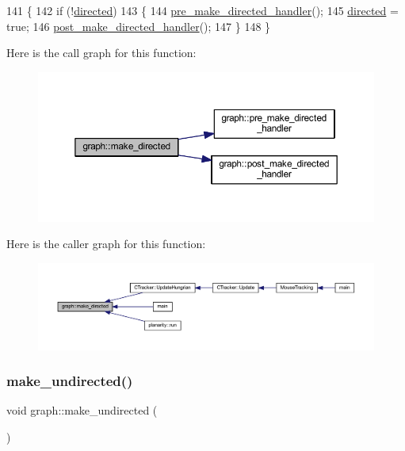 \begin{DoxyCode}
141 \{
142     \textcolor{keywordflow}{if} (!\mbox{\hyperlink{classgraph_ab4120df210eb3d03d20b0bd27f8cbe8c}{directed}})
143     \{
144     \mbox{\hyperlink{classgraph_a505198f412b1e426e9d09b62ea9811e8}{pre\_make\_directed\_handler}}();
145     \mbox{\hyperlink{classgraph_ab4120df210eb3d03d20b0bd27f8cbe8c}{directed}} = \textcolor{keyword}{true};
146     \mbox{\hyperlink{classgraph_a43dc35def3d8125eb8f3841d55e0b1c8}{post\_make\_directed\_handler}}();
147     \}
148 \}
\end{DoxyCode}
Here is the call graph for this function\+:
\nopagebreak
\begin{figure}[H]
\begin{center}
\leavevmode
\includegraphics[width=350pt]{classgraph_a1615678dee6248d6d8a00c553770b3bd_cgraph}
\end{center}
\end{figure}
Here is the caller graph for this function\+:
\nopagebreak
\begin{figure}[H]
\begin{center}
\leavevmode
\includegraphics[width=350pt]{classgraph_a1615678dee6248d6d8a00c553770b3bd_icgraph}
\end{center}
\end{figure}
\mbox{\label{classgraph_a31c8b895bd842f1b9dcc67649956cfc7}} 
\subsubsection{\texorpdfstring{make\+\_\+undirected()}{make\_undirected()}}
{\footnotesize\ttfamily void graph\+::make\+\_\+undirected (\begin{DoxyParamCaption}{ }\end{DoxyParamCaption})}

